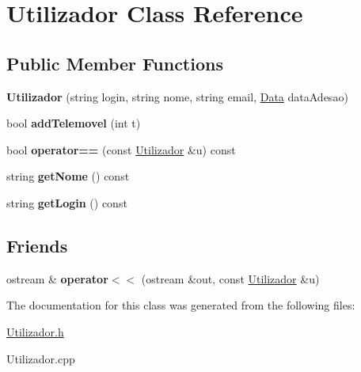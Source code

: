 \hypertarget{class_utilizador}{}\section{Utilizador Class Reference}
\label{class_utilizador}
\subsection*{Public Member Functions}
\begin{DoxyCompactItemize}
\item 
\hypertarget{class_utilizador_ab7d7d3512337c2483f664f882d639ade}{}{\bfseries Utilizador} (string login, string nome, string email, \hyperlink{class_data}{Data} data\+Adesao)\label{class_utilizador_ab7d7d3512337c2483f664f882d639ade}

\item 
\hypertarget{class_utilizador_a124306ea46d9588481d500285c2acc11}{}bool {\bfseries add\+Telemovel} (int t)\label{class_utilizador_a124306ea46d9588481d500285c2acc11}

\item 
\hypertarget{class_utilizador_a051ebe3fbeadbb5b00a78da320a9f49e}{}bool {\bfseries operator==} (const \hyperlink{class_utilizador}{Utilizador} \&u) const \label{class_utilizador_a051ebe3fbeadbb5b00a78da320a9f49e}

\item 
\hypertarget{class_utilizador_aa5af9c1385b0a93116dd8a80264b887a}{}string {\bfseries get\+Nome} () const \label{class_utilizador_aa5af9c1385b0a93116dd8a80264b887a}

\item 
\hypertarget{class_utilizador_ad6c565c391bd19de3462e50a4e05c9a6}{}string {\bfseries get\+Login} () const \label{class_utilizador_ad6c565c391bd19de3462e50a4e05c9a6}

\end{DoxyCompactItemize}
\subsection*{Friends}
\begin{DoxyCompactItemize}
\item 
\hypertarget{class_utilizador_ad02a468bf3828d06a96b41947147c754}{}ostream \& {\bfseries operator$<$$<$} (ostream \&out, const \hyperlink{class_utilizador}{Utilizador} \&u)\label{class_utilizador_ad02a468bf3828d06a96b41947147c754}

\end{DoxyCompactItemize}


The documentation for this class was generated from the following files\+:\begin{DoxyCompactItemize}
\item 
\hyperlink{_utilizador_8h}{Utilizador.\+h}\item 
Utilizador.\+cpp\end{DoxyCompactItemize}
